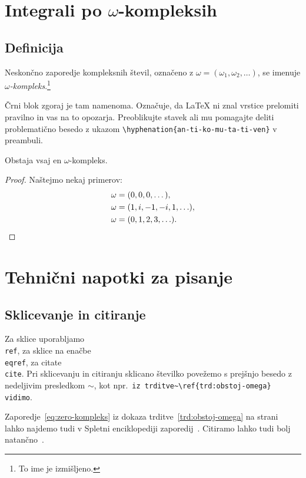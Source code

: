 \section{Integrali po \texorpdfstring{$\omega$}{ω}-kompleksih}
\subsection{Definicija}
\begin{definicija}
  Neskončno zaporedje kompleksnih števil, označeno z $\omega = (\omega_1, \omega_2, \ldots)$,
  se imenuje \emph{$\omega$-kompleks}.\footnote{To ime je izmišljeno.}

  Črni blok zgoraj je tam namenoma. Označuje, da \LaTeX{} ni znal vrstice prelomiti pravilno
  in vas na to opozarja. Preoblikujte stavek ali mu pomagajte deliti problematično besedo z
  ukazom \verb|\hyphenation{an-ti-ko-mu-ta-ti-ven}| v preambuli.
\end{definicija}
\begin{trditev}
  \label{trd:obstoj-omega}
  Obstaja vsaj en $\omega$-kompleks.
\end{trditev}
\begin{proof}
  Naštejmo nekaj primerov:
  \begin{align}
    \omega &= (0, 0, 0, \dots), \label{eq:zero-kompleks} \\
    \omega &= (1, i, -1, -i, 1, \ldots),  \\
    \omega &= (0, 1, 2, 3, \ldots). \qedhere  %
  \end{align}
\end{proof}
\section{Tehnični napotki za pisanje}
\subsection{Sklicevanje in citiranje}
Za sklice uporabljamo \texttt{\\ref}, za sklice na enačbe \texttt{\\eqref}, za citate \texttt{\\cite}. Pri
sklicevanju in citiranju sklicano številko povežemo s prejšnjo besedo z nedeljivim presledkom
$\sim$, kot npr.\ \verb|iz trditve~\ref{trd:obstoj-omega} vidimo|.

\begin{primer}
  Zaporedje~\eqref{eq:zero-kompleks} iz dokaza trditve~\ref{trd:obstoj-omega} na
  strani~\pageref{trd:obstoj-omega} lahko najdemo tudi v Spletni enciklopediji zaporedij~\cite{oeis}.
  Citiramo lahko tudi bolj natančno~\cite[trditev 2.1, str.\ 23]{lebedev2009introduction}.
\end{primer}

